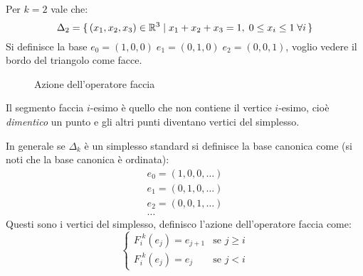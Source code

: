 \begin{example}[$ k = 2 $]
  Per $ k = 2 $ vale che:
  \[
    \Delta_2 = \set{ (x_1,x_2,x_3) \in \mathbb{R}^{3} | x_1 + x_2 + x_3 = 1, \; 0 \leq x_i \leq 1 \; \forall i}
  \]
  Si definisce la base $ e_0 = (1,0,0) \; e_1 = (0,1,0) \; e_2 = (0,0,1) $, voglio vedere il bordo del triangolo
  come facce.

  \begin{figure}[htbp]
    \centering
    \caption{Azione dell'operatore faccia}
    \label{fig:lez1:standard_simplex_faces}
  \end{figure}
\end{example}

Il segmento faccia $ i $-esimo è quello che non contiene il vertice $ i $-esimo, cioè
\emph{dimentico} un punto e gli altri punti diventano vertici del simplesso.

In generale se $ \Delta_k $ è un simplesso standard si definisce la base canonica come (si noti
che la base canonica è ordinata):
\begin{gather*}
  e_0 = (1,0,0,\dots)                            \\
  e_1 = (0,1,0,\dots)                            \\
  e_2 = (0,0,1,\dots)                            \\
  \dots
\end{gather*}
Questi sono i vertici del simplesso, definisco l'azione dell'operatore faccia
come:
\[
  \begin{cases}
    F_i^{\; k}(e_j) = e_{j+1}     & \text{se } j \geq i \\
    F_i^{\; k}(e_j) = e_{j} & \text{se } j < i
  \end{cases}
\]

